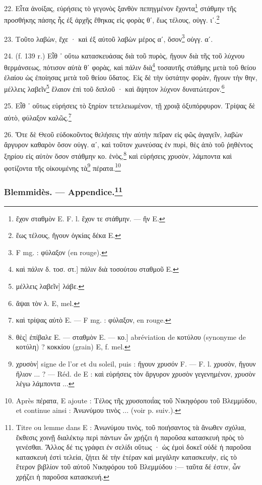 \documentclass[a4paper, 11pt, oneside, polutonikogreek, french]{article}
\begin{document}
22. Εἶτα ἀνοίξας, εὑρήσεις τὸ γεγονὸς ξανθὸν πεπηγμένον ἔχοντα\footnote{ἔχον σταθμὸν E. F. l. ἔχον τε στάθμην. --- ἥν E.} στάθμην τῆς προσθήκης πάσης ἧς ἐξ ἀρχῆς ἔθηκας εἰς φορὰς θʹ, ἕως τέλους, οὐγγ. ιʹ.\footnote{ἕως τέλους, ἤγουν ὀγκίας δέκα E.}

23. Τοῦτο λαβὼν, ἔχε · καὶ ἐξ αὐτοῦ λαβὼν μέρος αʹ, ὅσον\footnote{F mg. : φύλαξον (en rouge).} οὐγγ. αʹ.

24. (f. 139 r.) Εἶθ ᾽ οὕτω κατασκευάσας διὰ τοῦ πυρὸς, ἤγουν διὰ τῆς τοῦ λύχνου θερμάνσεως, πότισον αὐτὰ θʹ φορὰς, καὶ πάλιν διὰ\footnote{καὶ πάλιν δ. τοσ. στ.] πάλιν διὰ τοσούτου σταθμοῦ E.} τοσαυτῆς στάθμης μετὰ τοῦ θείου ἐλαίου ὡς ἐποίησας μετὰ τοῦ θείου ὕδατος. Εἰς δὲ τὴν ὑστάτην φορὰν, ἤγουν τὴν θην, μέλλεις λαβεῖν\footnote{μέλλεις λαβεῖν] λάβε.} ἔλαιον ἐπὶ τοῦ διπλοῦ · καὶ ἅψητον λύχνον δυνατώτερον.\footnote{ἅψαι τὸν λ. E, mel.}

25. Εἶθ ᾽ οὕτως εὑρήσεις τὸ ξηρίον τετελειωμένον, τῇ χροιᾷ ὀξυπόρφυρον. Τρίψας δὲ αὐτὸ, φύλαξον καλῶς.\footnote{καὶ τρίψας αὐτὸ E. --- F mg. : φύλαξον, en rouge.}

26. Ὅτε δὲ Θεοῦ εὐδοκοῦντος θελήσεις τὴν αὐτὴν πεῖραν εἰς φῶς ἀγαγεῖν, λαβὼν ἄργυρον καθαρὸν ὅσον οὐγγ. αʹ, καὶ τοῦτον χωνεύσας ἐν πυρὶ, θὲς ἀπὸ τοῦ ῥηθέντος ξηρίου εἰς αὐτὸν ὅσον στάθμην κο. ἑνὸς,\footnote{θὲς] ἐπίβαλε E. --- σταθμὸν E. --- κο.] abréviation de κοτύλου (synonyme de κοτύλη) ? κοκκίου (grain) E, f. mel.} καὶ εὑρήσεις χρυσὸν, λάμποντα καὶ φοτίζοντα τῆς οἰκουμένης τὰ\footnote{χρυσὸν] signe de l'or et du soleil, puis : ἤγουν χρυσόν F. --- F. l. χρυσὸν, ἤγουν ἥλιον ... ? --- Réd. de E : καὶ εὑρήσεις τὸν ἄργυρον χρυσὸν γεγενημένον, χρυσὸν λέγω λάμποντα ...} πέρατα.\footnote{Après πέρατα, Ε ajoute : Τέλος τῆς χρυσοποιΐας τοῦ Νικηφόρου τοῦ Βλεμμύδου, et continue ainsi : Ἀνωνύμου τινὸς ... (voir p. suiv.).}

\bigskip
\centerline{\EightStarTaper}
\centerline{\EightStarTaper\EightStarTaper}
\bigskip

\subsubsection[Blemmidès. --- Appendice.]{Blemmidès. --- Appendice.\footnote{Titre ou lemme dans E : Ἀνωνύμου τινὸς, τοῦ ποιήσαντος τὰ ἄνωθεν σχόλια, ἔκθεσις χοινῇ διαλέκτῳ περὶ πάντων ὧν χρῄζει ἡ παροῦσα κατασκευὴ πρὸς τὸ γενέσθαι. Ἄλλος δέ τις γράφει ἐν σελίδι οὕτως · ὡς ἐμοὶ δοκεῖ οὐδὲ ἡ παροῦσα κατασκευὴ ἐστὶ τελεία, ζήτει δὲ τὴν ἑτέραν καὶ μεγάλην κατασκευὴν, εἰς τὸ ἕτερον βιβλίον τοῦ αὐτοῦ Νικηφόρου τοῦ Βλεμμύδου :--- ταῦτα δέ ἐστιν, ὧν χρῄζει ἡ παροῦσα κατασκευή.}}
\end{document}
